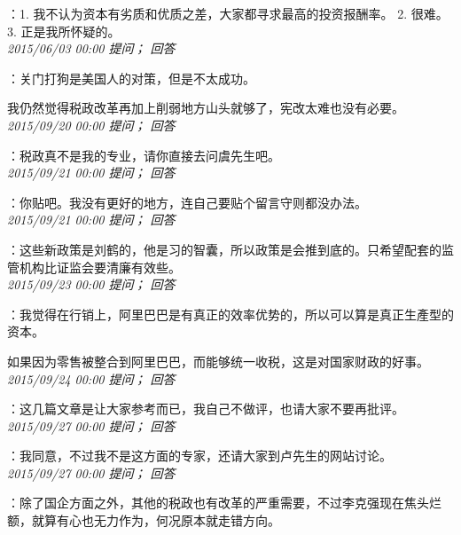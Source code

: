 \documentclass[twocolumn]{ctexart}
\begin{document}
：1. 我不认为资本有劣质和优质之差，大家都寻求最高的投资报酬率。
2. 很难。
3. 正是我所怀疑的。\\

\textit{\hfill\noindent\small 2015/06/03 00:00 提问； 回答}

：关门打狗是美国人的对策，但是不太成功。

我仍然觉得税政改革再加上削弱地方山头就够了，宪改太难也没有必要。\\

\textit{\hfill\noindent\small 2015/09/20 00:00 提问； 回答}

：税政真不是我的专业，请你直接去问虞先生吧。\\

\textit{\hfill\noindent\small 2015/09/21 00:00 提问； 回答}

：你贴吧。我没有更好的地方，连自己要贴个留言守则都没办法。\\

\textit{\hfill\noindent\small 2015/09/21 00:00 提问； 回答}

：这些新政策是刘鹤的，他是习的智囊，所以政策是会推到底的。只希望配套的监管机构比证监会要清廉有效些。\\

\textit{\hfill\noindent\small 2015/09/23 00:00 提问； 回答}

：我觉得在行销上，阿里巴巴是有真正的效率优势的，所以可以算是真正生產型的资本。

如果因为零售被整合到阿里巴巴，而能够统一收税，这是对国家财政的好事。\\

\textit{\hfill\noindent\small 2015/09/24 00:00 提问； 回答}

：这几篇文章是让大家参考而已，我自己不做评，也请大家不要再批评。\\

\textit{\hfill\noindent\small 2015/09/27 00:00 提问； 回答}

：我同意，不过我不是这方面的专家，还请大家到卢先生的网站讨论。\\

\textit{\hfill\noindent\small 2015/09/27 00:00 提问； 回答}

：除了国企方面之外，其他的税政也有改革的严重需要，不过李克强现在焦头烂额，就算有心也无力作为，何况原本就走错方向。\\
\end{document}
